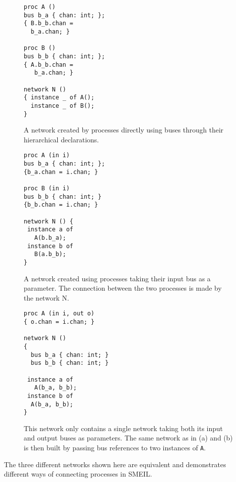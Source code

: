 \begin{widefigure}
  \begin{subfigure}[t]{0.33\textwidth}
    \begin{lstlisting}[language=smeil]
proc A ()
bus b_a { chan: int; };
{ B.b_b.chan =
  b_a.chan; }

proc B ()
bus b_b { chan: int; };
{ A.b_b.chan =
   b_a.chan; }

network N ()
{ instance _ of A();
  instance _ of B();
}
\end{lstlisting}
  \caption{A network created by processes directly using buses through their
    hierarchical declarations.}
  \label{fig:directpublic}
  \end{subfigure}
  \begin{subfigure}[t]{0.33\textwidth}
    \begin{lstlisting}[language=smeil]
proc A (in i)
bus b_a { chan: int; };
{b_a.chan = i.chan; }

proc B (in i)
bus b_b { chan: int; }
{b_b.chan = i.chan; }

network N () {
 instance a of
   A(b.b_a);
 instance b of
   B(a.b_b);
}
\end{lstlisting}
    \caption{A network created using processes taking their input bus as a
      parameter. The connection between the two processes is made by the network
      N.}
  \end{subfigure}
  \begin{subfigure}[t]{0.32\textwidth}
    \begin{lstlisting}[language=smeil]
proc A (in i, out o)
{ o.chan = i.chan; }

network N ()
{
  bus b_a { chan: int; }
  bus b_b { chan: int; }

 instance a of
   A(b_a, b_b);
 instance b of
  A(b_a, b_b);
}
\end{lstlisting}
    \caption{This network only contains a single network taking both its input
      and output buses as parameters. The same network as in (a) and (b) is then
      built by passing bus references to two instances of {\tt A}.}
    
  \end{subfigure}

  \caption{The three different networks shown here are equivalent and
    demonstrates different ways of connecting processes in SMEIL.}
  \label{fig:comms}
\end{widefigure}


